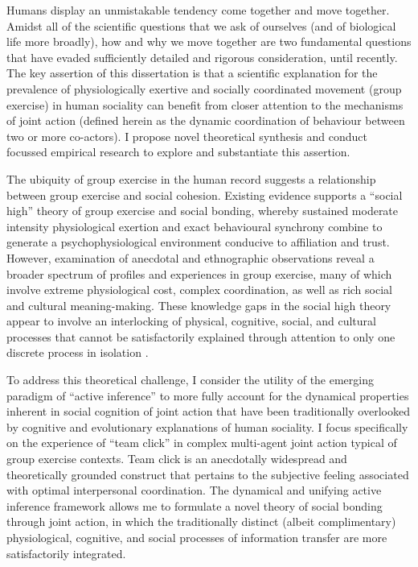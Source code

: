Humans display an unmistakable tendency come together and move together.  Amidst all of the scientific questions that we ask of ourselves (and of biological life more broadly), how and why we move together are two fundamental questions that have evaded sufficiently detailed and rigorous consideration, until recently.  The key assertion of this dissertation is that a scientific explanation for the prevalence of physiologically exertive and socially coordinated movement (group exercise) in human sociality can benefit from closer attention to the mechanisms of joint action (defined herein as the dynamic coordination of behaviour between two or more co-actors).  I propose novel theoretical synthesis and conduct focussed empirical research to explore and substantiate this assertion.

The ubiquity of group exercise in the human record suggests a relationship between group exercise and social cohesion.  Existing evidence supports a ``social high'' theory of group exercise and social bonding, whereby sustained moderate intensity physiological exertion and exact behavioural synchrony combine to generate a psychophysiological environment conducive to affiliation and trust.   However, examination of anecdotal and ethnographic observations reveal a broader spectrum of profiles and experiences in group exercise, many of which involve extreme physiological cost, complex coordination, as well as rich social and cultural meaning-making.  These knowledge gaps in the social high theory appear to involve an interlocking of physical, cognitive, social, and cultural processes that cannot be satisfactorily explained through attention to only one discrete process in isolation \citep{Kenrick2001}.

To address this theoretical challenge, I consider the utility of the emerging paradigm of ``active inference'' \citep{Friston2010} to more fully account for the dynamical properties inherent in social cognition of joint action that have been traditionally overlooked by cognitive and evolutionary explanations of human sociality.  I focus specifically on the experience of ``team click'' in complex multi-agent joint action typical of group exercise contexts.  Team click is an anecdotally widespread and theoretically grounded construct that pertains to the subjective feeling associated with optimal interpersonal coordination.  The dynamical and unifying active inference framework allows me to formulate a novel theory of social bonding through joint action, in which the traditionally distinct (albeit complimentary) physiological, cognitive, and social processes of information transfer are more satisfactorily integrated.

